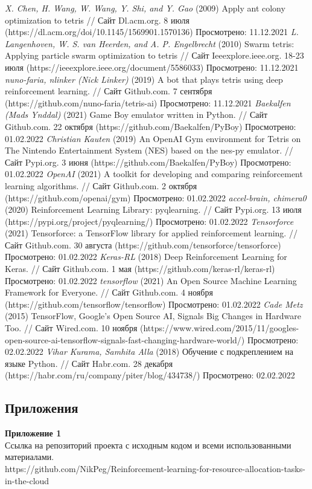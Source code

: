 \documentclass{article}
\newcommand\zz[1]{\par{\normalsize\strut #1} \hfill\ignorespaces}
\begin{document}
\begin{center}
\begin{thebibliography}{}
 \textit{X. Chen, H. Wang, W. Wang, Y. Shi, and Y. Gao} (2009) Apply ant colony optimization to tetris // Сайт Dl.acm.org. 8 июля (https://dl.acm.org/doi/10.1145/1569901.1570136) Просмотрено: 11.12.2021
 \textit{L. Langenhoven, W. S. van Heerden, and A. P. Engelbrecht} (2010) Swarm tetris: Applying particle swarm optimization to tetris // Сайт Ieeexplore.ieee.org. 18-23 июля (https://ieeexplore.ieee.org/document/5586033) Просмотрено: 11.12.2021
 \textit{nuno-faria, nlinker (Nick Linker)} (2019) A bot that plays tetris using deep reinforcement learning. // Сайт Github.com. 7 сентября (https://github.com/nuno-faria/tetris-ai) Просмотрено: 11.12.2021
 \textit{Baekalfen (Mads Ynddal)} (2021) Game Boy emulator written in Python. // Сайт Github.com. 22 октября (https://github.com/Baekalfen/PyBoy) Просмотрено: 01.02.2022
 \textit{Christian Kauten} (2019) An OpenAI Gym environment for Tetris on The Nintendo Entertainment System (NES) based on the nes-py emulator. // Сайт Pypi.org. 3 июня (https://github.com/Baekalfen/PyBoy) Просмотрено: 01.02.2022
 \textit{OpenAI} (2021) A toolkit for developing and comparing reinforcement learning algorithms. // Сайт Github.com. 2 октября (https://github.com/openai/gym) Просмотрено: 01.02.2022
 \textit{accel-brain, chimera0} (2020) Reinforcement Learning Library: pyqlearning. // Сайт Pypi.org. 13 июля (https://pypi.org/project/pyqlearning/) Просмотрено: 01.02.2022
 \textit{Tensorforce} (2021) Tensorforce: a TensorFlow library for applied reinforcement learning. // Сайт Github.com. 30 августа (https://github.com/tensorforce/tensorforce) Просмотрено: 01.02.2022
 \textit{Keras-RL} (2018) Deep Reinforcement Learning for Keras. // Сайт Github.com. 1 мая (https://github.com/keras-rl/keras-rl) Просмотрено: 01.02.2022
 \textit{tensorflow} (2021) An Open Source Machine Learning Framework for Everyone. // Сайт Github.com. 4 ноября (https://github.com/tensorflow/tensorflow) Просмотрено: 01.02.2022
 \textit{Cade Metz} (2015) TensorFlow, Google's Open Source AI, Signals Big Changes in Hardware Too. // Сайт Wired.com. 10 ноября (https://www.wired.com/2015/11/googles-open-source-ai-tensorflow-signals-fast-changing-hardware-world/) Просмотрено: 02.02.2022
 \textit{Vihar Kurama, Samhita Alla} (2018) Обучение с подкреплением на языке Python. // Сайт Habr.com. 28 декабря (https://habr.com/ru/company/piter/blog/434738/) Просмотрено: 02.02.2022
\end{thebibliography}
\end{center}
\newpage
\begin{center}
\section {Приложения}
\end{center}
\zz{}\textbf{Приложение 1\\}
Ссылка на репозиторий проекта с исходным кодом и всеми использованными материалами.\\
https://github.com/NikPeg/Reinforcement-learning-for-resource-allocation-tasks-in-the-cloud
\end{document}
